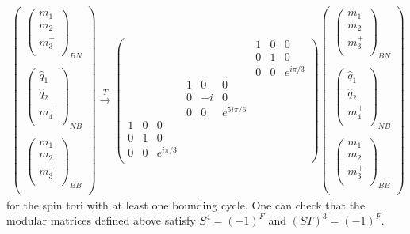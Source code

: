 \begin{align}
\left(\begin{matrix}
\left( \begin{matrix}
{m}_1\\
{m}_2\\
m_3^+\\
\end{matrix} \right)_{BN} \\
\\
\left( \begin{matrix}
\widehat{{q}}_1\\
\widehat{{q}}_2\\
m_4^+\\
\end{matrix} \right)_{NB}\\
\\
\left( \begin{matrix}
{m}_1\\
{m}_2\\
m_3^+\\
\end{matrix} \right)_{BB} \\
\end{matrix} \right)
\xrightarrow{T} \left( \begin{matrix}
&&&			&&&			1&0&0	\\
&&&			&&&			0&1&0	\\
&&&			&&&			0&0&e^{i \pi/3}	\\
&&&			1&0&0&			&&	\\
&&&			0&-i&0&			&&	\\
&&&			0&0&e^{5 i \pi /6}&			&&	\\
1&0&0&			&&&			&&	\\
0&1&0&			&&&			&&	\\
0&0&e^{i \pi /3}&			&&&			&&	\\		
\end{matrix} \right)
\left(\begin{matrix}
\left( \begin{matrix}
{m}_1\\
{m}_2\\
m_3^+\\
\end{matrix} \right)_{BN} \\
\\
\left( \begin{matrix}
\widehat{{q}}_1\\
\widehat{{q}}_2\\
m_4^+\\
\end{matrix} \right)_{NB}\\
\\
\left( \begin{matrix}
{m}_1\\
{m}_2\\
m_3^+\\
\end{matrix} \right)_{BB} \\
\end{matrix} \right)
\end{align}
for the spin tori with at least one bounding cycle.
One can check that the modular matrices defined above satisfy $S^4 = (-1)^F$ and $(ST)^3 = (-1)^F$. 



